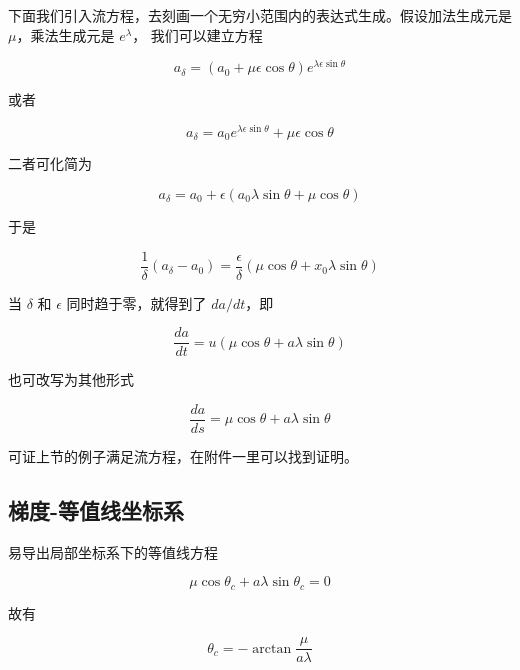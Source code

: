 \documentclass[a4paper,12pt]{article}
\numberwithin{problem}{section}
\numberwithin{definition}{section}
\numberwithin{lemma}{section}
\numberwithin{proposition}{section}
\numberwithin{theorem}{section}
\numberwithin{grammar}{section}
\numberwithin{program}{section}
\numberwithin{convention}{section}
\numberwithin{corollary}{section}
\begin{document}
下面我们引入流方程，去刻画一个无穷小范围内的表达式生成。假设加法生成元是 $\mu$，乘法生成元是 $e^\lambda$， 我们可以建立方程

\begin{equation}
    a_{\delta} = (a_0 + \mu \epsilon \cos \theta)e^{\lambda \epsilon \sin \theta}
\end{equation}

或者

\begin{equation}
    a_{\delta} = a_0 e^{\lambda \epsilon \sin \theta} + \mu \epsilon \cos \theta
\end{equation}

二者可化简为

\begin{equation}
    a_{\delta} = a_0 + \epsilon (a_0 \lambda \sin \theta + \mu \cos \theta)
\end{equation}

于是

\begin{equation}
    \frac{1}{\delta} (a_{\delta} - a_0) = \frac{\epsilon}{\delta} (\mu \cos \theta + x_0 \lambda \sin \theta)
\end{equation}

当 $\delta$ 和 $\epsilon$ 同时趋于零，就得到了 $da / dt$，即

\begin{equation}
    \frac{da}{dt} = u (\mu \cos \theta + a \lambda \sin \theta)
\end{equation}

也可改写为其他形式

\begin{equation}
    \frac{da}{ds} = \mu \cos \theta + a \lambda \sin \theta\label{eq:flow}
\end{equation}

可证上节的例子满足流方程，在附件一里可以找到证明。

\subsection{梯度-等值线坐标系}

易导出局部坐标系下的等值线方程

\begin{equation}
    \mu \cos \theta_c + a \lambda \sin \theta_c = 0
\end{equation}

故有

\begin{equation}
    \theta_c = - \arctan \frac{\mu}{a \lambda}
\end{equation}
\end{document}
